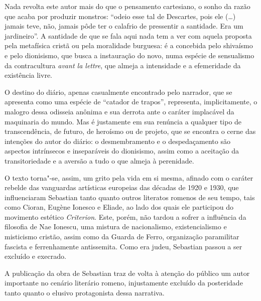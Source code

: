 Nada revolta este autor mais do que o pensamento cartesiano, o sonho da
razão que acaba por produzir monstros: ``odeio esse tal de Descartes,
pois ele (\ldots{}) jamais teve, não, jamais pôde ter o calafrio de
pressentir a santidade. Era um jardineiro''. A santidade de que se fala
aqui nada tem a ver com aquela proposta pela metafísica cristã ou pela
moralidade burguesa: é a concebida pelo shivaísmo e pelo dionisismo, que
busca a instauração do novo, numa espécie de sensualismo da
contracultura \emph{avant la lettre}, que almeja a intensidade e a
efemeridade da existência livre.

O destino do diário, apenas casualmente encontrado pelo narrador, que se
apresenta como uma espécie de ``catador de trapos'', representa,
implicitamente, o malogro dessa odisseia anônima e sua derrota ante o
caráter implacável da maquinaria do mundo. Mas é justamente em sua
renúncia a qualquer tipo de transcendência, de futuro, de heroísmo ou de
projeto, que se encontra o cerne das intenções do autor do diário: o
desmembramento e o despedaçamento são aspectos intrínsecos e
inseparáveis do dionisismo, assim como a aceitação da transitoriedade e
a aversão a tudo o que almeja à perenidade.

O texto torna"-se, assim, um grito pela vida em si mesma, afinado com o
caráter rebelde das vanguardas artísticas europeias das décadas de 1920
e 1930, que influenciaram Sebastian tanto quanto outros literatos
romenos de seu tempo, tais como Cioran, Eugène Ionesco e Eliade, ao lado dos
quais ele participou do movimento estético \emph{Criterion}. Este, porém, não
tardou a sofrer a influência da filosofia de Nae Ionescu, uma mistura de
nacionalismo, existencialismo e misticismo cristão, assim como da Guarda
de Ferro, organização paramilitar fascista e ferrenhamente antissemita.
Como era judeu, Sebastian passou a ser excluído e execrado.

A publicação da obra de Sebastian traz de volta à atenção do público um
autor importante no cenário literário romeno, injustamente excluído da
posteridade tanto quanto o elusivo protagonista dessa narrativa. %


\pagebreak
\blankpage
